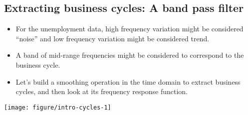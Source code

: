 \documentclass[]{article}
\newenvironment{Shaded}{\begin{snugshade}}{\end{snugshade}}
\newcommand{\KeywordTok}[1]{\textcolor[rgb]{0.13,0.29,0.53}{\textbf{#1}}}
\newcommand{\DataTypeTok}[1]{\textcolor[rgb]{0.13,0.29,0.53}{#1}}
\newcommand{\DecValTok}[1]{\textcolor[rgb]{0.00,0.00,0.81}{#1}}
\newcommand{\FloatTok}[1]{\textcolor[rgb]{0.00,0.00,0.81}{#1}}
\newcommand{\StringTok}[1]{\textcolor[rgb]{0.31,0.60,0.02}{#1}}
\newcommand{\OperatorTok}[1]{\textcolor[rgb]{0.81,0.36,0.00}{\textbf{#1}}}
\newcommand{\NormalTok}[1]{#1}
\begin{document}
\subsection{Extracting business cycles: A band pass
filter}\label{extracting-business-cycles-a-band-pass-filter}

\begin{itemize}
\item
  For the unemployment data, high frequency variation might be
  considered ``noise'' and low frequency variation might be considered
  trend.
\item
  A band of mid-range frequencies might be considered to correspond to
  the business cycle.
\item
  Let's build a smoothing operation in the time domain to extract
  business cycles, and then look at its frequency response function.
\end{itemize}

\begin{Shaded}
\end{Shaded}

\begin{center}\texttt{[image: figure/intro-cycles-1]} \end{center}
\end{document}
